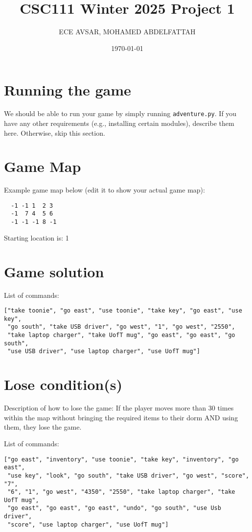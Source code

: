 \documentclass[11pt]{article}
\title{CSC111 Winter 2025 Project 1}
\author{ECE AVSAR, MOHAMED ABDELFATTAH}
\date{\today}
\begin{document}
\maketitle

\section*{Running the game}
We should be able to run your game by simply running \texttt{adventure.py}.  
If you have any other requirements (e.g., installing certain modules), describe them here.  
Otherwise, skip this section.

\section*{Game Map}
Example game map below (edit it to show your actual game map):

\begin{verbatim}
  -1 -1 1  2 3
  -1  7 4  5 6
  -1 -1 -1 8 -1
\end{verbatim}

Starting location is: 1

\section*{Game solution}
List of commands:
\begin{verbatim}
["take toonie", "go east", "use toonie", "take key", "go east", "use key",
 "go south", "take USB driver", "go west", "1", "go west", "2550",
 "take laptop charger", "take UofT mug", "go east", "go east", "go south",
 "use USB driver", "use laptop charger", "use UofT mug"]
\end{verbatim}

\section*{Lose condition(s)}
Description of how to lose the game:  
If the player moves more than 30 times within the map without bringing the required items  
to their dorm AND using them, they lose the game.

List of commands: 
\begin{verbatim}
["go east", "inventory", "use toonie", "take key", "inventory", "go east",
 "use key", "look", "go south", "take USB driver", "go west", "score", "7",
 "6", "1", "go west", "4350", "2550", "take laptop charger", "take UofT mug",
 "go east", "go east", "go east", "undo", "go south", "use Usb driver",
 "score", "use laptop charger", "use UofT mug"]
\end{verbatim}
\end{document}
